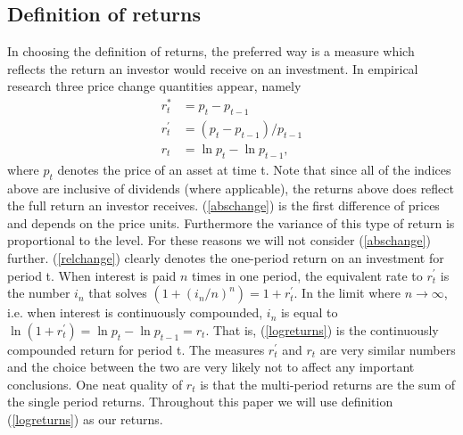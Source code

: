 \documentclass[11pt,a4paper,oneside]{article}
\begin{document}
\subsection*{Definition of returns}
\noindent In choosing the definition of returns, the preferred way is a measure which reflects the return an investor would receive on an investment. In empirical research three price change quantities appear, namely
\vspace{-5mm}
\begin{align}
    r_t^* &= p_t-p_{t-1}  \label{abschange} \\
    r_t^{'} &= (p_t-p_{t-1})/p_{t-1} \label{relchange} \\
    r_t   &= \ln{p_t}-\ln{p_{t-1}} \label{logreturns},
\end{align}
where $p_t$ denotes the price of an asset at time t. Note that since all of the indices above are inclusive of dividends (where applicable), the returns above does reflect the full return an investor receives. (\ref{abschange}) is the first difference of prices and depends on the price units. Furthermore the variance of this type of return is proportional to the level. For these reasons we will not  consider (\ref{abschange}) further. (\ref{relchange}) clearly denotes the one-period return on an investment for period t. When interest is paid $n$ times in one period, the equivalent rate to $r_t^{'}$ is the number $i_n$ that solves $(1+(i_n/n)^n)=1+r_t^{'}$. In the limit where $n\rightarrow \infty$, i.e. when interest is continuously compounded, $i_n$ is equal to $\ln{(1+r_t^{'})}=\ln{p_t}-\ln{p_{t-1}}=r_t$. That is, (\ref{logreturns}) is the continuously compounded return for period t. The measures $r_t^{'}$ and $r_t$ are very similar numbers and the choice between the two are very likely not to affect any important conclusions\cite{Taylor}. One neat quality of $r_t$ is that the multi-period returns are the sum of the single period returns. Throughout this paper we will use definition (\ref{logreturns}) as our returns. 
\end{document}
